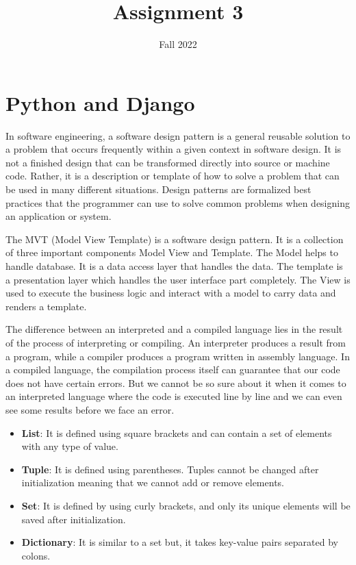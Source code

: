 \documentclass{homework}
\author{}
\date{Fall 2022}
\title{Assignment 3}
\begin{document}
 \maketitle

\section*{Python and Django}
\question
In software engineering, a software design pattern is a general reusable solution to a problem that occurs frequently within a given context in software design. It is not a finished design that can be transformed directly into source or machine code. Rather, it is a description or template of how to solve a problem that can be used in many different situations. Design patterns are formalized best practices that the programmer can use to solve common problems when designing an application or system.\cite{design}

The MVT (Model View Template) is a software design pattern. It is a collection of three important components Model View and Template. The Model helps to handle database. It is a data access layer that handles the data.
The template is a presentation layer which handles the user interface part completely. The View is used to execute the business logic and interact with a model to carry data and renders a template. \cite{mvt}

\question The difference between an interpreted and a compiled language lies in the result of the process of interpreting or compiling. An interpreter produces a result from a program, while a compiler produces a program written in assembly language.
In a compiled language, the compilation process itself can guarantee that our code does not have certain errors. But we cannot be so sure about it when it comes to an interpreted language where the code is executed line by line and we can even see some results before we face an error.

\question 
\begin{itemize}
    \item \textbf{List}: It is defined using square brackets and can contain a set of elements with any type of value.
    \item \textbf{Tuple}: It is defined using parentheses. Tuples cannot be changed after initialization meaning that we cannot add or remove elements.
    \item \textbf{Set}: It is defined by using curly brackets, and only its unique elements will be saved after initialization.
    \item \textbf{Dictionary}: It is similar to a set but, it takes key-value pairs separated by colons.
\end{itemize}
\end{document}

